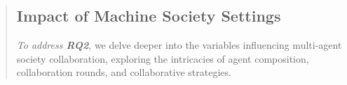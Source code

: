 \documentclass[11pt]{article}
\begin{document}
\begin{abstract}



\subsection{Impact of Machine Society Settings}
\label{sec:impact_of_other_factors}

\emph{To address \textbf{RQ2}}, 
we delve deeper into the variables influencing multi-agent society collaboration, exploring the intricacies of agent composition, collaboration rounds, and collaborative strategies. 


\end{abstract}
\end{document}
